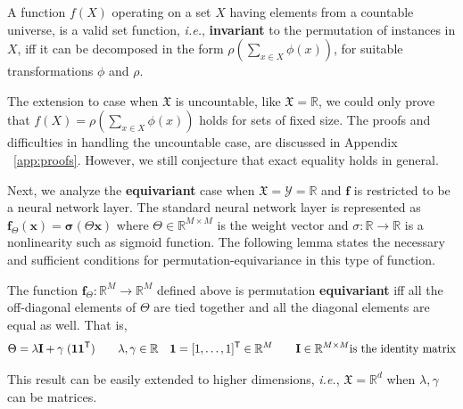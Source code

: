 \documentclass{article}
\newcommand{\refapp}[1]{Appendix ~\ref{#1}}
\newcommand{\xx}[0]{\ensuremath{\mathbf{x}}}
\newcommand{\ff}[0]{\ensuremath{\mathbf{f}}}
\newcommand{\latinphrase}[1]{\emph{#1}}    %
\newcommand{\ie}{\latinphrase{i.e.}\xspace}
\begin{document}
\begin{theorem}\label{thm:universal}
\vspace{-3mm}
A function $f(X)$ operating on a set $X$ having elements from a countable universe, is a valid set function, \ie, \textbf{invariant} to the permutation of instances in $X$, iff it can be decomposed in the form $\rho \left( \sum_{x\in X} \phi(x) \right)$, for suitable transformations $\phi$ and $\rho$.
\end{theorem}
\vspace{-3mm}

The extension to case when $\mathfrak{X}$ is uncountable, like $\mathfrak{X}=\mathbb{R}$, we could only prove that $f(X) = \rho \left( \sum_{x\in X} \phi(x) \right)$ holds for sets of fixed size.
The proofs and difficulties in handling the uncountable case, are discussed in \refapp{app:proofs}. However, we still conjecture that exact equality holds in general.

Next, we analyze the \textbf{equivariant} case when $\mathfrak{X}=\mathcal{Y}=\mathbb{R}$ and $\ff$ is restricted to be a neural network layer. The standard neural network layer is represented as $\ff_{\Theta}(\xx) = \boldsymbol{\sigma}( \Theta \xx)$ 
where $\Theta \in \mathbb{R}^{M \times M}$ is the weight vector and $\sigma: \mathbb{R} \to \mathbb{R}$ is a nonlinearity such as sigmoid function. The following lemma states the necessary and sufficient conditions for permutation-equivariance in this type of function. 
\begin{lemma}\label{lemma:equivariant}
\vspace{-3mm}
The function $\ff_{\Theta}: \mathbb{R}^{M} \to \mathbb{R}^{M}$ defined above is permutation \textbf{equivariant} iff all the off-diagonal elements of $\Theta$ are tied together and all the diagonal elements are equal as well. That is,
\vspace{-3mm}
\begin{align}
\vspace{-3mm}
 \Theta = {\lambda} \mathbf{I} + {\gamma} \; (\mathbf{1} \mathbf{1}^{\mathsf{T}})\quad\quad {\lambda},{\gamma} \in \mathbb{R} \quad \mathbf{1} = [1,\ldots,1]^{\mathsf{T}} \in \mathbb{R}^M \quad\quad \mathbf{I}\in\mathbb{R}^{M\times M} \text{is the identity matrix}
 \nonumber
\end{align}
\end{lemma}
\vspace{-3mm}
This result can be easily extended to higher dimensions, \ie,  $\mathfrak{X}=\mathbb{R}^d$ when $\lambda, \gamma$ can be matrices.
\end{document}
